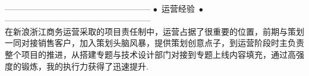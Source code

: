 \documentclass[12pt,a4paper,roman]{moderncv} %
\begin{document}
\begin{CJK*}{UTF8}{gkai}
{{\vspace*{4pt}
\\
\vspace*{4pt}
-----------------------------------------------------
$\bullet$~运营经验~$\bullet$
-----------------------------------------------------
\\ \hspace*{6mm} 在新浪浙江商务运营采取的项目责任制中，运营占据了很重要的位置，前期与策划一同对接销售客户，加入策划头脑风暴，提供策划创意点子，到运营阶段时主负责整个项目的推进，从搭建专题与技术设计部门对接到专题上线内容填充，通过高强度的锻炼，我的执行力获得了迅速提升.
\\}}



\section{}


%


\end{CJK*}
\end{document}
